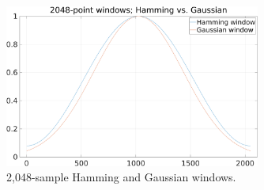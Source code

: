 \documentclass[report.tex]{subfiles}
\begin{document}
\begin{figure}[ht]
	\centering
	\includegraphics[width=0.7500\textwidth]{./images-tftheory/hamming_vs_gauss.png}
	\caption{2,048-sample Hamming and Gaussian windows.}
	\label{fig:gaussvshamm}
\end{figure}

\newpagefill
\end{document}
